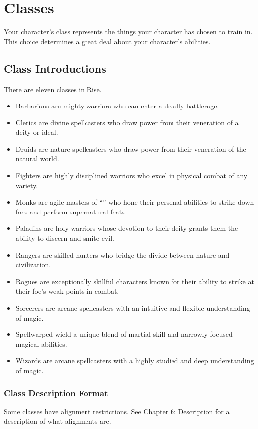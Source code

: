 \chapter{Classes}
Your character's class represents the things your character has chosen to train in. This choice determines a great deal about your character's abilities.

\section{Class Introductions}
There are eleven classes in Rise.
\begin{itemize}
  \item Barbarians are mighty warriors who can enter a deadly battlerage.
  \item Clerics are divine spellcasters who draw power from their veneration of a deity or ideal.
  \item Druids are nature spellcasters who draw power from their veneration of the natural world.
  \item Fighters are highly disciplined warriors who excel in physical combat of any variety.
  \item Monks are agile masters of ``\ki'' who hone their personal abilities to strike down foes and perform supernatural feats.
  \item Paladins are holy warriors whose devotion to their deity grants them the ability to discern and smite evil.
  \item Rangers are skilled hunters who bridge the divide between nature and civilization.
  \item Rogues are exceptionally skillful characters known for their ability to strike at their foe's weak points in combat.
  \item Sorcerers are arcane spellcasters with an intuitive and flexible understanding of magic.
  \item Spellwarped wield a unique blend of martial skill and narrowly focused magical abilities.
  \item Wizards are arcane spellcasters with a highly studied and deep understanding of magic.
\end{itemize}

\subsection{Class Description Format}

 Some classes have alignment restrictions. See Chapter 6: Description for a description of what alignments are.

